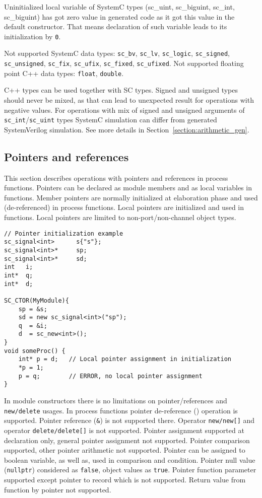 Uninitialized local variable of SystemC types (sc\_uint, sc\_biguint, sc\_int, sc\_biguint) has got zero value in generated code as it got this value in the default constructor.
That means declaration of such variable leads to its initialization by {\tt 0}.

Not supported SystemC data types: {\tt sc\_bv}, {\tt sc\_lv}, {\tt sc\_logic}, {\tt sc\_signed}, {\tt sc\_unsigned}, {\tt sc\_fix}, {\tt sc\_ufix}, {\tt sc\_fixed}, {\tt sc\_ufixed}. 
Not supported floating point C++ data types: {\tt float}, {\tt double}.

C++ types can be used together with SC types. Signed and unsigned types should never be mixed, as that can lead to unexpected result for operations with negative values. For operations with mix of signed and unsigned arguments of {\tt sc\_int}/{\tt sc\_uint} types SystemC simulation can differ from generated SystemVerilog simulation. See more details in Section~\ref{section:arithmetic_gen}.



\subsection{Pointers and references}

This section describes operations with pointers and references in process functions. 
Pointers can be declared as module members and as local variables in functions. Member pointers are normally initialized at elaboration phase and used (de-referenced) in process functions. Local pointers are initialized and used in functions. Local pointers are limited to non-port/non-channel object types. 

\begin{lstlisting}[style=mycpp]
// Pointer initialization example
sc_signal<int>      s{"s"};
sc_signal<int>*     sp;
sc_signal<int>*     sd;
int   i;
int*  q;
int*  d;

SC_CTOR(MyModule){
    sp = &s;
    sd = new sc_signal<int>("sp");   
    q  = &i;
    d  = sc_new<int>();
}
void someProc() {
    int* p = d;   // Local pointer assignment in initialization
    *p = 1;
    p = q;        // ERROR, no local pointer assignment   
}
\end{lstlisting}

In module constructors there is no limitations on pointer/references and {\tt new/delete} usages. In process functions pointer de-reference ({\tt *}) operation is supported. Pointer reference ({\tt \&}) is not supported there. Operator {\tt new/new[]} and operator {\tt delete/delete[]} is not supported. Pointer assignment supported at declaration only, general pointer assignment not supported. Pointer comparison supported, other pointer arithmetic not supported. Pointer can be assigned to boolean variable, as well as, used in comparison and condition. Pointer null value ({\tt nullptr}) considered as {\tt false}, object values as {\tt true}.
Pointer function parameter supported except pointer to record which is not supported. Return value from function by pointer not supported.

